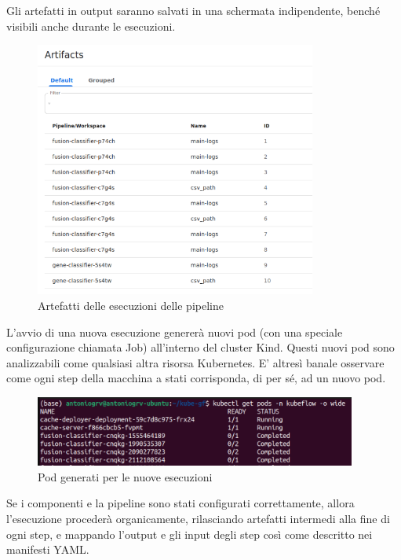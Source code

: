 Gli artefatti in output saranno salvati in una schermata indipendente, benché visibili anche durante le esecuzioni.

\begin{figure}[H]
    \centering
    \includegraphics[width=350px]{figures/ch4and5/artifacts.png}
    \caption[Artefatti delle esecuzioni delle pipeline]{Artefatti delle esecuzioni delle pipeline}
    \label{fig:cha6:art}
\end{figure}

L'avvio di una nuova esecuzione genererà nuovi pod (con una speciale configurazione chiamata Job) all'interno del cluster Kind. Questi nuovi pod sono analizzabili come qualsiasi altra risorsa Kubernetes. E' altresì banale osservare come ogni step della macchina a stati corrisponda, di per sé, ad un nuovo pod.

\begin{figure}[H]
    \centering
    \includegraphics[width=400px]{figures/ch4and5/pods.png}
    \caption[Pod generati per le nuove esecuzioni]{Pod generati per le nuove esecuzioni}
    \label{fig:cha6:kf-pods}
\end{figure}

Se i componenti e la pipeline sono stati configurati correttamente, allora l'esecuzione procederà organicamente, rilasciando artefatti intermedi alla fine di ogni step, e mappando l'output e gli input degli step così come descritto nei manifesti YAML.

